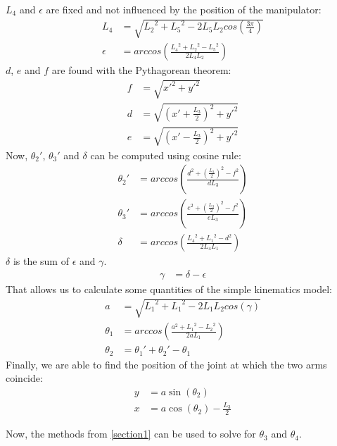 \documentclass{sig-alternate-05-2015}
\begin{document}
$L_4$ and $\epsilon$ are fixed and not influenced by the position of the manipulator:
\begin{align*}
L_4 &= \sqrt{{L_2}^2 + {L_5}^2 - 2L_5L_2cos\left(\frac{3\pi}{4}\right)}\\
\epsilon &= arccos\left(  \frac{{L_4}^2 + {L_2}^2 - {L_5}^2}{2L_4L_2} \right)\end{align*}
$d$, $e$ and $f$ are found with the Pythagorean theorem:
\begin{align*}
f &= \sqrt{{x'}^2 + {y'}^2}\\
d &= \sqrt{\left(x'+ \frac{L_3}{2}\right)^2 + {y'}^2}\\
e &= \sqrt{\left(x'- \frac{L_3}{2}\right)^2 + {y'}^2}
\end{align*}
Now, $\theta_2'$, $\theta_3'$ and $\delta$ can be computed using cosine rule:
\begin{align*}
\theta_2' &= arccos\left(  \frac{d^2 + (\frac{L_3}{2})^2 - f^2}{dL_3} \right)\\
\theta_3' &= arccos\left(  \frac{e^2 + (\frac{L_3}{2})^2 - f^2}{eL_3} \right)\\
\delta    &= arccos\left(  \frac{{L_4}^2 + {L_1}^2 - d^2}{2L_4L_1} \right)
\end{align*}
$\delta$ is the sum of $\epsilon$ and $\gamma$.
\begin{align*}
\gamma &= \delta - \epsilon
\end{align*}
That allows us to calculate some quantities of the simple kinematics model:
\begin{align*}
a 		 &= \sqrt{{L_1}^2 + {L_1}^2 - 2L_1L_2cos\left(\gamma\right)}\\
\theta_1 &= arccos\left(  \frac{a^2 + {L_1}^2 - {L_2}^2}{2aL_1} \right)\\
\theta_2 &= \theta_1' + \theta_2' - \theta_1
\end{align*}
Finally, we are able to find the position of the joint at which the two arms coincide:
\begin{align*}
y &= a \sin(\theta_2)\\
x &= a\cos(\theta_2) - \frac{L_3}{2}
\end{align*}

Now, the methods from \autoref{section1} can be used to solve for $\theta_3$ and $\theta_4$.
\end{document}
